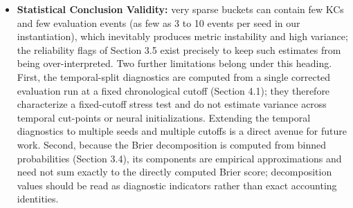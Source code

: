 \begin{itemize}
    \item \textbf{Statistical Conclusion Validity:} very sparse buckets can contain few KCs and few evaluation events (as few as 3 to 10 events per seed in our instantiation), which inevitably produces metric instability and high variance; the reliability flags of Section 3.5 exist precisely to keep such estimates from being over-interpreted. Two further limitations belong under this heading. First, the temporal-split diagnostics are computed from a single corrected evaluation run at a fixed chronological cutoff (Section 4.1); they therefore characterize a fixed-cutoff stress test and do not estimate variance across temporal cut-points or neural initializations. Extending the temporal diagnostics to multiple seeds and multiple cutoffs is a direct avenue for future work. Second, because the Brier decomposition is computed from binned probabilities (Section 3.4), its components are empirical approximations and need not sum exactly to the directly computed Brier score; decomposition values should be read as diagnostic indicators rather than exact accounting identities.
\end{itemize}
